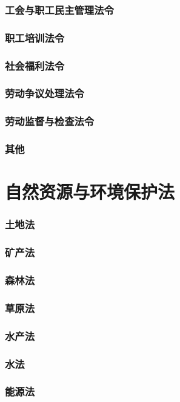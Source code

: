 \documentclass[UTF8]{../ApplicationUniverse}
\begin{document}
        \subsubsection{工会与职工民主管理法令}
        \subsubsection{职工培训法令}
        \subsubsection{社会福利法令}
        \subsubsection{劳动争议处理法令}
        \subsubsection{劳动监督与检查法令}
        \subsubsection{其他}

\section{自然资源与环境保护法}
        \subsubsection{土地法}
        \subsubsection{矿产法}
        \subsubsection{森林法}
        \subsubsection{草原法}
        \subsubsection{水产法}
        \subsubsection{水法}
        \subsubsection{能源法}
\end{document}
